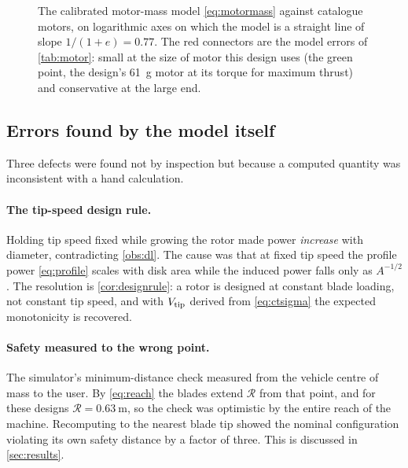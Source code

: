 \begin{figure}[tbp]
\centering

\caption{The calibrated motor-mass model \cref{eq:motormass} against catalogue
motors, on logarithmic axes on which the model is a straight line of slope
$1/(1+e)=0.77$. The red connectors are the model errors of \cref{tab:motor}:
small at the size of motor this design uses (the green point, the design's
\SI{61}{\gram} motor at its torque for maximum thrust) and conservative at the
large end.}
\label{fig:motorcal}
\end{figure}

\subsection{Errors found by the model itself}

Three defects were found not by inspection but because a computed quantity was
inconsistent with a hand calculation.

\paragraph{The tip-speed design rule.} Holding tip speed fixed while growing
the rotor made power \emph{increase} with diameter, contradicting
\cref{obs:dl}. The cause was that at fixed tip speed the profile power
\cref{eq:profile} scales with disk area while the induced power falls only as
$A^{-1/2}$. The resolution is \cref{cor:designrule}: a rotor is designed at
constant blade loading, not constant tip speed, and with $V_{\mathrm{tip}}$ derived from
\cref{eq:ctsigma} the expected monotonicity is recovered.

\paragraph{Safety measured to the wrong point.} The simulator's minimum-distance
check measured from the vehicle centre of mass to the user. By \cref{eq:reach}
the blades extend $\mathcal{R}$ from that point, and for these designs
$\mathcal{R}=\SI{0.63}{\metre}$, so the check was optimistic by the entire reach
of the machine. Recomputing to the nearest blade tip showed the nominal
configuration violating its own safety distance by a factor of three. This is
discussed in \cref{sec:results}.

